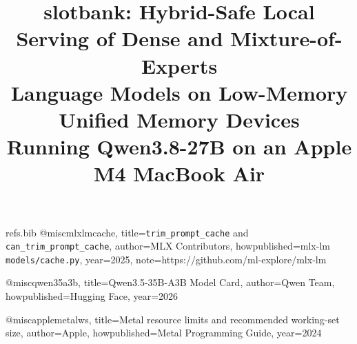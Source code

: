 \begin{filecontents*}[overwrite]{refs.bib}
@misc{mlxlmcache,
  title={\texttt{trim\_prompt\_cache} and \texttt{can\_trim\_prompt\_cache}},
  author={{MLX Contributors}},
  howpublished={mlx-lm \texttt{models/cache.py}},
  year={2025},
  note={https://github.com/ml-explore/mlx-lm}
}

@misc{qwen35a3b,
  title={{Qwen3.5-35B-A3B} Model Card},
  author={{Qwen Team}},
  howpublished={Hugging Face},
  year={2026}
}

@misc{applemetalws,
  title={{Metal} resource limits and recommended working-set size},
  author={{Apple}},
  howpublished={Metal Programming Guide},
  year={2024}
}
\end{filecontents*}

\documentclass[11pt]{article}

\usepackage[margin=1in]{geometry}
\usepackage{times}
\usepackage{amsmath,amssymb,amsthm}
\usepackage{booktabs}
\usepackage{graphicx}
\usepackage{xcolor}
\usepackage{tikz}
\usetikzlibrary{arrows.meta,positioning,fit,calc,shapes.geometric,patterns}
\usepackage{algorithm}
\usepackage{algpseudocode}
\usepackage{hyperref}
\usepackage{natbib}
\usepackage{enumitem}
\usepackage{caption}
\usepackage{fancyhdr}
\usepackage{microtype}
\usepackage{url}
\usepackage{array}
\usepackage{placeins}


\pagestyle{fancy}
\fancyhf{}
\fancyfoot[C]{\thepage}
\renewcommand{\headrulewidth}{0.4pt}

\theoremstyle{definition}
\newtheorem{definition}{Definition}

\newcommand{\slotbank}{\textsc{slotbank}}
\newcommand{\gdn}{Gated DeltaNet}

\title{\vspace{-1.2em}
\textbf{slotbank}: Hybrid-Safe Local Serving of Dense and Mixture-of-Experts\\
Language Models on Low-Memory Unified Memory Devices\\[0.4em]
\large Running Qwen3.8-27B on an Apple M4 MacBook Air}

